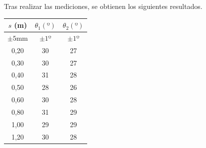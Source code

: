 \documentclass[10pt,a4paper,hidelinks]{article}
\begin{document}
\begin{multicols}{2}
\begin{center}
\end{center}


Tras realizar las mediciones, se obtienen los siguientes resultados.
\begin{center}
\begin{tabular}{ | c | c | c | }
\hline
$s$ (m) & $\theta_1(º)$ & $\theta_2(º)$ \\ \hline
$\pm5$mm & $\pm1º$ & $\pm1º$ \\ \hline \hline
0,20 & 30 & 27 \\ \hline
0,30 & 30 & 27 \\ \hline
0,40 & 31 & 28 \\ \hline
0,50 & 28 & 26 \\ \hline
0,60 & 30 & 28 \\ \hline
0,80 & 31 & 29 \\ \hline
1,00 & 29 & 29 \\ \hline
1,20 & 30 & 28 \\ \hline
\end{tabular}
\end{center}


\end{multicols}
\end{document}
